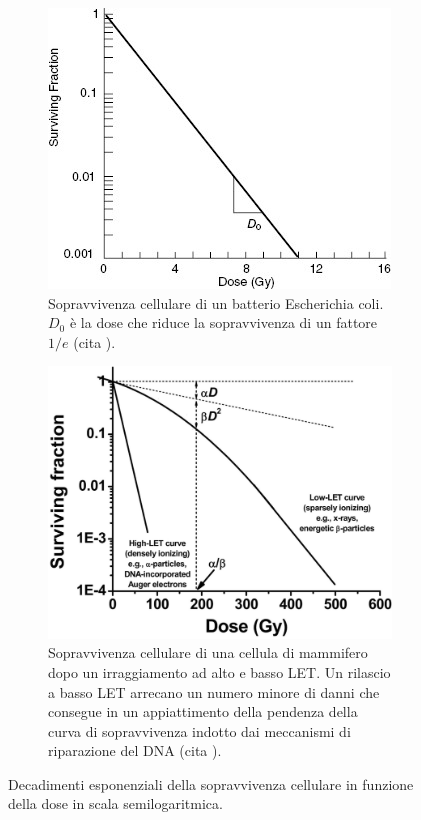 \documentclass[12pt,a4paper,twoside]{report}
\begin{document}
	\begin{figure}[H]
		\centering
		\begin{subfigure}[t]{0.49\textwidth}
			\centering
			\includegraphics[width=\textwidth, scale=0.50]{survival1.jpg}
			\caption{Sopravvivenza cellulare di un batterio Escherichia coli. $D_0$ è la dose che riduce la sopravvivenza di un fattore $1/e$ (cita
				).}
			\label{fig:survival1}
		\end{subfigure}
		\hfill
		\begin{subfigure}[t]{0.49\textwidth}
			\centering
			\includegraphics[width=\textwidth, scale=0.50]{survival2.png}
			\caption{Sopravvivenza cellulare di una cellula di mammifero dopo un irraggiamento ad alto e basso LET. Un rilascio a basso LET arrecano un numero minore di danni che consegue in un appiattimento della pendenza della curva di sopravvivenza indotto dai meccanismi di riparazione del DNA (cita
				).}
			\label{fig:survival2}
		\end{subfigure}
		\caption{Decadimenti esponenziali della sopravvivenza cellulare in funzione della dose in scala semilogaritmica.}
	\end{figure}
	
\end{document}
